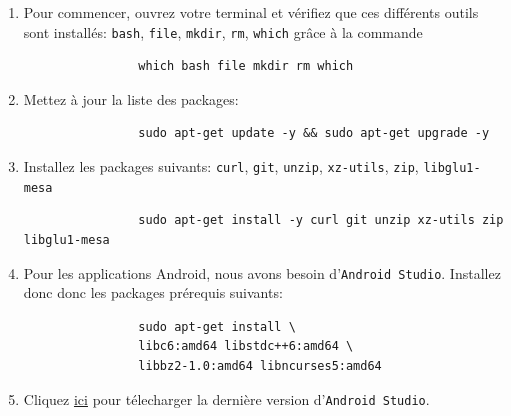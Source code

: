 \begin{enumerate}
  \item Pour commencer, ouvrez votre terminal et vérifiez que ces différents outils sont installés: \texttt{bash}, \texttt{file}, \texttt{mkdir}, \texttt{rm}, \texttt{which} grâce à la commande

    \vspace{0.3cm}
    \begin{lstlisting}
                which bash file mkdir rm which
    \end{lstlisting}
    \vspace{0.2cm}

  \item Mettez à jour la liste des packages:

    \vspace{0.3cm}
    \begin{lstlisting}
                sudo apt-get update -y && sudo apt-get upgrade -y
    \end{lstlisting}
    \vspace{0.2cm}

  \item Installez les packages suivants: \texttt{curl}, \texttt{git}, \texttt{unzip}, \texttt{xz-utils}, \texttt{zip}, \texttt{libglu1-mesa}

    \vspace{0.3cm}
    \begin{lstlisting}
                sudo apt-get install -y curl git unzip xz-utils zip libglu1-mesa
    \end{lstlisting}
    \vspace{0.2cm}

  \item Pour les applications Android, nous avons besoin d'\texttt{Android Studio}. Installez donc donc les packages prérequis suivants:

    \vspace{0.3cm}
    \begin{lstlisting}
                sudo apt-get install \
                libc6:amd64 libstdc++6:amd64 \
                libbz2-1.0:amd64 libncurses5:amd64
    \end{lstlisting}
    \vspace{0.2cm}

  \item Cliquez \href{https://developer.android.com/studio?hl=fr}{ici} pour télecharger la dernière version d'\texttt{Android Studio}.\\


\end{enumerate}
